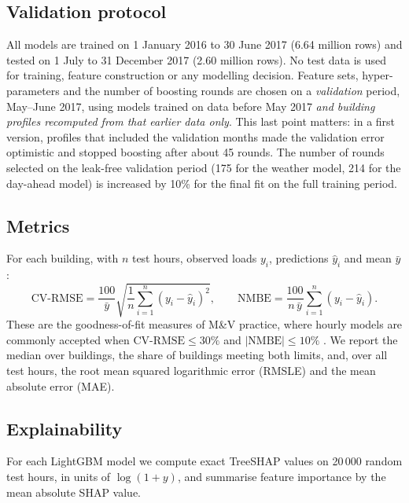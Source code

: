\documentclass[11pt,a4paper]{article}
\newcommand{\cvrmse}{\mathrm{CV\text{-}RMSE}}
\newcommand{\nmbe}{\mathrm{NMBE}}
\begin{document}
\subsection{Validation protocol}
All models are trained on 1 January 2016 to 30 June 2017 (6.64 million rows) and tested on 1 July to 31 December
2017 (2.60 million rows). No test data is used for training, feature construction or any modelling decision.
Feature sets, hyper-parameters and the number of boosting rounds are chosen on a \emph{validation} period, May--June
2017, using models trained on data before May 2017 \emph{and building profiles recomputed from that earlier data
only}. This last point matters: in a first version, profiles that included the validation months made the
validation error optimistic and stopped boosting after about 45 rounds. The number of rounds selected on the
leak-free validation period (175 for the weather model, 214 for the day-ahead model) is increased by 10\% for the
final fit on the full training period.

\subsection{Metrics}
For each building, with $n$ test hours, observed loads $y_i$, predictions $\hat{y}_i$ and mean $\bar{y}$:
\begin{equation}
\cvrmse = \frac{100}{\bar{y}}\sqrt{\frac{1}{n}\sum_{i=1}^{n}(y_i-\hat{y}_i)^2},\qquad
\nmbe = \frac{100}{n\,\bar{y}}\sum_{i=1}^{n}(y_i-\hat{y}_i).
\end{equation}
These are the goodness-of-fit measures of M\&V practice, where hourly models are commonly accepted when
$\cvrmse\le 30\%$ and $|\nmbe|\le 10\%$ \citep{ashrae2014guideline14}. We report the median over buildings, the share of
buildings meeting both limits, and, over all test hours, the root mean squared logarithmic error (RMSLE) and the mean
absolute error (MAE).

\subsection{Explainability}
For each LightGBM model we compute exact TreeSHAP values \citep{lundberg2020trees} on 20\,000 random test hours, in
units of $\log(1+y)$, and summarise feature importance by the mean absolute SHAP value.
\end{document}
